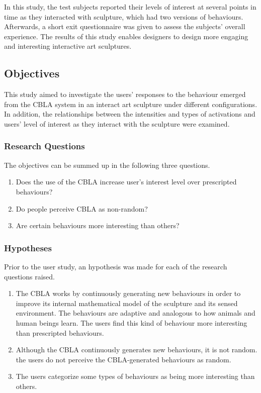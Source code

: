 In this study, the test subjects reported their levels of interest at several points in time as they interacted with sculpture, which had two versions of behaviours. Afterwards, a short exit questionnaire was given to assess the subjects' overall experience. The results of this study enables designers to design more engaging and interesting interactive art sculptures. 

\subsection{Objectives}\label{sec:user-study-objectives}

This study aimed to investigate the users' responses to the behaviour emerged from the CBLA system in an interact art sculpture under different configurations. In addition, the relationships between the intensities and types of activations and users' level of interest as they interact with the sculpture were examined.

\subsubsection{Research Questions}

The objectives can be summed up in the following three questions.

\begin{enumerate}
	\item Does the use of the CBLA increase user's interest level over prescripted behaviours?\label{itm:research-q1}
	\item Do people perceive CBLA as non-random?\label{itm:research-q2}
	\item Are certain behaviours  more interesting than others?\label{itm:research-q3}
\end{enumerate}


\subsubsection{Hypotheses}

Prior to the user study, an hypothesis was made for each of the research questions raised.

\begin{enumerate}
	\item The CBLA works by continuously generating new behaviours in order to improve its internal mathematical model of the sculpture and its sensed environment. The behaviours are adaptive and analogous to how animals and human beings learn. The users find this kind of behaviour more interesting than prescripted behaviours.
	\item Although the CBLA continuously generates new behaviours, it is not random. the users do not perceive the CBLA-generated behaviours as random. 
	\item The users categorize some types of behaviours as being more interesting than others. 
\end{enumerate}

